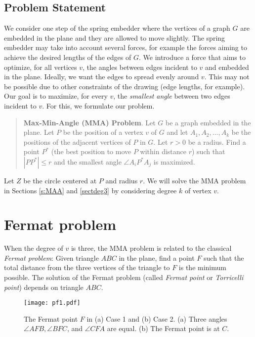 \documentclass[10pt]{article}
\begin{document}
\subsection{Problem Statement}

We consider one step of the spring embedder where the vertices of a
graph $G$ are embedded in the plane and they are allowed to move
slightly. The spring embedder may take into account several forces,
for example the forces aiming to achieve the desired lengths of the edges
of $G$. We introduce a force that aims to optimize, for all vertices
$v$, the angles between edges incident to $v$ and embedded in the
plane. Ideally, we want the edges to spread evenly around $v$. This
may not be possible due to other constraints of the drawing (edge
lengths, for example). Our goal is to maximize, for every $v$,  the
{\em smallest angle} between two edges incident to $v$. 
For this, we formulate our problem.

\begin{quote}
{\bf Max-Min-Angle (MMA) Problem}.
Let $G$ be a graph embedded in the plane. Let $P$ be the position
of a vertex $v$ of $G$ and let $A_1,A_2,\dots,A_k$ be the positions of the adjacent
vertices of $P$ in $G$. Let $r>0$ be a radius. Find a point $P^*$ (the
best position to move $P$ within distance $r$) such that $|PP^*|\le r$
and the smallest angle $\angle A_iP^*A_j$ is maximized.
\end{quote}

Let $Z$ be the circle centered at $P$ and radius $r$. 
We will solve the MMA problem in Sections \ref{s:MAA} and \ref{sectdeg3}
by considering degree $k$ of vertex $v$.

\section{Fermat problem} \label{s3}

When the degree of $v$ is three, the MMA  problem is related to 
the classical {\em Fermat problem}: Given triangle $ABC$ in the plane, find a point $F$ such that the total distance from the three vertices of the triangle to $F$ is the minimum possible. 
The solution of the Fermat problem (called {\em Fermat point} or {\em Torricelli point}) depends on triangle $ABC$.

\begin{figure}[htp] 
\centering
\texttt{[image: pf1.pdf]}
\caption{The Fermat point $F$ in (a) Case 1 and (b) Case 2.
(a) Three angles $\angle AFB, \angle BFC$, and $\angle CFA$ are equal.
(b) The Fermat point is at $C$.}
\label{pf1}
\end{figure}
\end{document}
